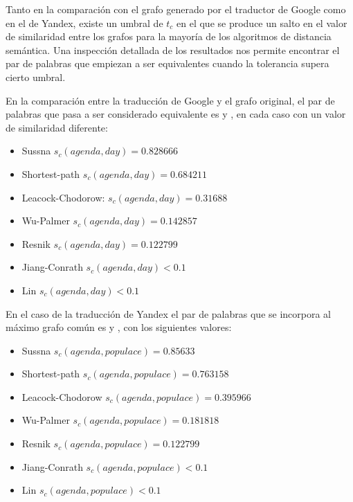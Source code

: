 \documentclass[a4paper,12pt,spanish]{book}
\begin{document}
Tanto en la comparación con el grafo generado por el traductor de Google como
en el de Yandex, existe un umbral de \(t_c\) en el que se produce un salto
en el valor de similaridad entre los grafos para la mayoría de los algoritmos
de distancia semántica. Una inspección detallada de los resultados nos permite
encontrar el par de palabras que empiezan a ser equivalentes cuando la tolerancia
supera cierto umbral.

En la comparación entre la traducción de Google y el grafo original, el par de
palabras que pasa a ser considerado equivalente es  y , en cada
caso con un valor de similaridad diferente:
\begin{itemize}
\item {} 
Sussna \(s_c(agenda, day) = 0.828666\)

\item {} 
Shortest-path \(s_c(agenda, day) = 0.684211\)

\item {} 
Leacock-Chodorow: \(s_c(agenda, day) = 0.31688\)

\item {} 
Wu-Palmer \(s_c(agenda, day) = 0.142857\)

\item {} 
Resnik \(s_c(agenda, day) = 0.122799\)

\item {} 
Jiang-Conrath \(s_c(agenda, day) < 0.1\)

\item {} 
Lin \(s_c(agenda, day) < 0.1\)

\end{itemize}

En el caso de la traducción de Yandex el par de palabras que se incorpora al
máximo grafo común es  y , con los siguientes valores:
\begin{itemize}
\item {} 
Sussna \(s_c(agenda, populace) = 0.85633\)

\item {} 
Shortest-path \(s_c(agenda, populace) = 0.763158\)

\item {} 
Leacock-Chodorow \(s_c(agenda, populace) = 0.395966\)

\item {} 
Wu-Palmer \(s_c(agenda, populace) = 0.181818\)

\item {} 
Resnik \(s_c(agenda, populace) = 0.122799\)

\item {} 
Jiang-Conrath \(s_c(agenda, populace) < 0.1\)

\item {} 
Lin \(s_c(agenda, populace) < 0.1\)

\end{itemize}
\end{document}
